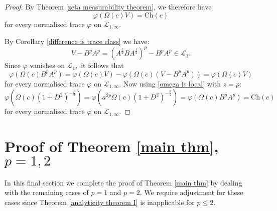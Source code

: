 \begin{proof}
        By Theorem \ref{zeta measurability theorem}, we therefore have
        $$\varphi(\Omega(c)V)=\mathrm{Ch}(c)$$
        for every normalised trace $\varphi$ on $\mathcal{L}_{1,\infty}.$

        By Corollary \ref{difference is trace class} we have:
        $$V-B^pA^p=(A^{\frac12}BA^{\frac12})^p-B^pA^p\in\mathcal{L}_1.$$
        Since $\varphi$ vanishes on $\mathcal{L}_1,$ it follows that
        $$\varphi(\Omega(c)B^pA^p)=\varphi(\Omega(c)V)-\varphi(\Omega(c)(V-B^pA^p))=\varphi(\Omega(c)V)$$
        for every normalised trace $\varphi$ on $\mathcal{L}_{1,\infty}.$ Now using \eqref{omega is local} with $z = p$:
        $$\varphi(\Omega(c)(1+D^2)^{-\frac{p}{2}})=\varphi(a^{2p}\Omega(c)(1+D^2)^{-\frac{p}{2}})=\varphi(\Omega(c)B^pA^p)=\mathrm{Ch}(c)$$
        for every normalised trace $\varphi$ on $\mathcal{L}_{1,\infty}.$
    \end{proof}

\section[Proof of the main result, $p=1,2$]{Proof of Theorem \ref{main thm}, $p=1,2$}\label{main thm p=1,2}

    In this final section we complete the proof of Theorem \ref{main thm} by dealing with the remaining cases of $p = 1$ and $p=2$.
    { We require adjustment for these cases since Theorem \ref{analyticity theorem I} is inapplicable for $p \leq 2$.}

